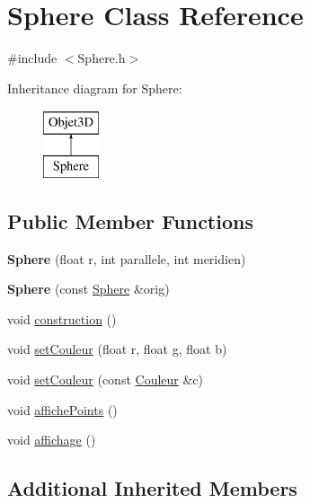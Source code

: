 \hypertarget{classSphere}{\section{Sphere Class Reference}
\label{classSphere}
}


{\ttfamily \#include $<$Sphere.\-h$>$}

Inheritance diagram for Sphere\-:\begin{figure}[H]
\begin{center}
\leavevmode
\includegraphics[height=2.000000cm]{classSphere}
\end{center}
\end{figure}
\subsection*{Public Member Functions}
\begin{DoxyCompactItemize}
\item 
\hypertarget{classSphere_ae9f149be4c2fd7ad78488cdd237ba560}{{\bfseries Sphere} (float r, int parallele, int meridien)}\label{classSphere_ae9f149be4c2fd7ad78488cdd237ba560}

\item 
\hypertarget{classSphere_a20d301e4c5016a72b6dbcdcaf38c839b}{{\bfseries Sphere} (const \hyperlink{classSphere}{Sphere} \&orig)}\label{classSphere_a20d301e4c5016a72b6dbcdcaf38c839b}

\item 
void \hyperlink{classSphere_a60631bd7158f7c443ebc5bda6066d2a2}{construction} ()
\item 
void \hyperlink{classSphere_ae0e7a735e87a6e90562bec0d887de08c}{set\-Couleur} (float r, float g, float b)
\item 
void \hyperlink{classSphere_a5a859a0055c250295ef6b13b662d9e76}{set\-Couleur} (const \hyperlink{classCouleur}{Couleur} \&c)
\item 
void \hyperlink{classSphere_ad39d66f77eb545c05f16b51539c80269}{affiche\-Points} ()
\item 
void \hyperlink{classSphere_a58ba7340a42539ffd726413e2a3178a3}{affichage} ()
\end{DoxyCompactItemize}
\subsection*{Additional Inherited Members}



